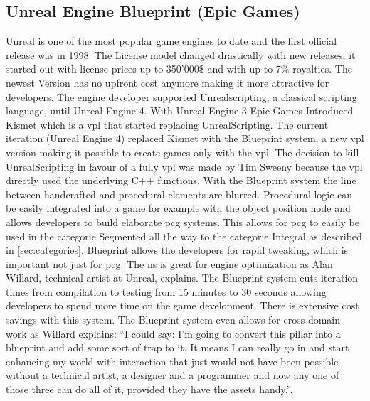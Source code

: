\documentclass[10pt,a4paper]{article}
\begin{document}
\subsection{Unreal Engine Blueprint (Epic Games)}
\begin{multicols}{2}
Unreal is one of the most popular game engines to date and the first official release was in 1998. The License model changed drastically with new releases, it started out with license prices up to 350’000\$ and with up to 7\% royalties\cite{Herz1999}. The newest Version has no upfront cost anymore making it more attractive for developers. The engine developer supported Unrealscripting, a classical scripting language, until Unreal Engine 4. With Unreal Engine 3 Epic Games Introduced Kismet which is a \gls{vpl} that started replacing UnrealScripting. The current iteration (Unreal Engine 4) replaced Kismet with the Blueprint system, a new \gls{vpl} version making it possible to create games only with the \gls{vpl}. The decision to kill UnrealScripting in favour of a fully \gls{vpl} was made by Tim Sweeny because the \gls{vpl} directly used the underlying C++ functions\cite{Wawro2017}. With the Blueprint system the line between handcrafted and procedural elements are blurred. Procedural logic can be easily integrated into a game for example with the object position node and allows developers to build elaborate \gls{pcg} systems. This allows for \gls{pcg} to easily be used in the categorie Segmented all the way to the categorie Integral as described in \autoref{sec:categories}. Blueprint allows the developers for rapid tweaking, which is important not just for \gls{pcg}. The \gls{ns} is great for engine optimization as Alan Willard, technical artist at Unreal, explains. The Blueprint system cuts iteration times from compilation to testing from 15 minutes to 30 seconds allowing developers to spend more time on the game development\cite{Totilo2012}. There is extensive cost savings with this system. The Blueprint system even allows for cross domain work as Willard explains: “I could say: I’m going to convert this pillar into a blueprint and add some sort of trap to it. It means I can really go in and start enhancing my world with interaction that just would not have been possible without a technical artist, a designer and a programmer and now any one of those three can do all of it, provided they have the assets handy.”\cite{Totilo2012}.\end{multicols}
\end{document}
